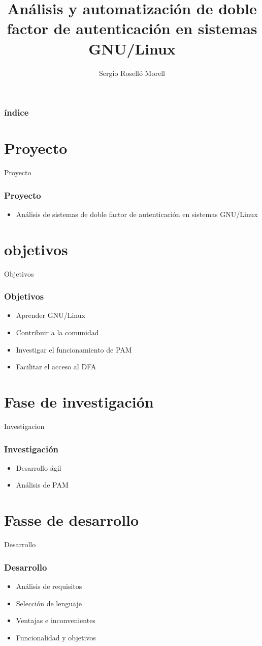 \documentclass{beamer}
\title{Análisis y automatización de doble factor de autenticación en sistemas GNU/Linux}
\author{Sergio Roselló Morell}
\begin{document}
\frame{\titlepage}

\begin{frame}
\frametitle{índice}
\tableofcontents
\end{frame}
\section{Proyecto}
\begin{frame}{Proyecto}
\frametitle{Proyecto}
\begin{itemize}
	\item Análisis de sistemas de doble factor de autenticación en sistemas GNU/Linux
\end{itemize}
\end{frame}
\section{objetivos}
\begin{frame}{Objetivos}
	\frametitle{Objetivos}
	\begin{itemize}
		\item Aprender GNU/Linux
		\item Contribuir a la comunidad
		\item Investigar el funcionamiento de PAM
		\item Facilitar el acceso al DFA
	\end{itemize}
\end{frame}
\section{Fase de investigación}
\begin{frame}{Investigacion}
	\frametitle{Investigación}
	\begin{itemize}
		\item Desarrollo ágil
		\item Análisis de PAM
	\end{itemize}
\end{frame}
\section{Fasse de desarrollo}
\begin{frame}{Desarrollo}
	\frametitle{Desarrollo}
	\begin{itemize}
		\item Análisis de requisitos
		\item Selección de lenguaje
		\item Ventajas e inconvenientes
		\item Funcionalidad y objetivos
	\end{itemize}
\end{frame}
\end{document}
